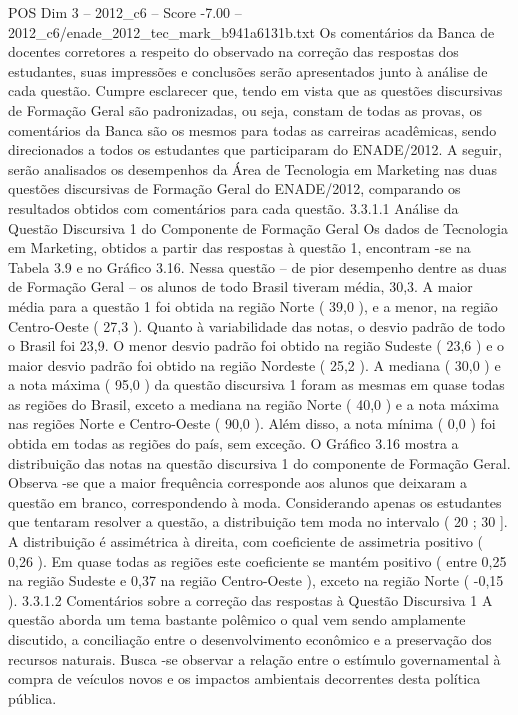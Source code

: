 \begin{textsample}{POS Dim 3 – 2012\_c6 – Score -7.00 – 2012\_c6/enade\_2012\_tec\_mark\_b941a6131b.txt}
Os comentários da Banca de docentes corretores a respeito do observado na correção das respostas dos estudantes, suas impressões e conclusões serão apresentados junto à análise de cada questão.
Cumpre esclarecer que, tendo em vista que as questões discursivas de Formação Geral são padronizadas, ou seja, constam de todas as provas, os comentários da Banca são os mesmos para todas as carreiras acadêmicas, sendo direcionados a todos os estudantes que participaram do ENADE/2012.
A seguir, serão analisados os desempenhos da Área de Tecnologia em Marketing nas duas questões discursivas de Formação Geral do ENADE/2012, comparando os resultados obtidos com comentários para cada questão. 3.3.1.1 Análise da Questão Discursiva 1 do Componente de Formação Geral Os dados de Tecnologia em Marketing, obtidos a partir das respostas à questão 1, encontram -se na Tabela 3.9 e no Gráfico 3.16.
Nessa questão – de pior desempenho dentre as duas de Formação Geral – os alunos de todo Brasil tiveram média, 30,3.
A maior média para a questão 1 foi obtida na região Norte ( 39,0 ), e a menor, na região Centro-Oeste ( 27,3 ).
Quanto à variabilidade das notas, o desvio padrão de todo o Brasil foi 23,9.
O menor desvio padrão foi obtido na região Sudeste ( 23,6 ) e o maior desvio padrão foi obtido na região Nordeste ( 25,2 ).
A mediana ( 30,0 ) e a nota máxima ( 95,0 ) da questão discursiva 1 foram as mesmas em quase todas as regiões do Brasil, exceto a mediana na região Norte ( 40,0 ) e a nota máxima nas regiões Norte e Centro-Oeste ( 90,0 ).
Além disso, a nota mínima ( 0,0 ) foi obtida em todas as regiões do país, sem exceção.
O Gráfico 3.16 mostra a distribuição das notas na questão discursiva 1 do componente de Formação Geral.
Observa -se que a maior frequência corresponde aos alunos que deixaram a questão em branco, correspondendo à moda.
Considerando apenas os estudantes que tentaram resolver a questão, a distribuição tem moda no intervalo ( 20 ; 30 ].
A distribuição é assimétrica à direita, com coeficiente de assimetria positivo ( 0,26 ).
Em quase todas as regiões este coeficiente se mantém positivo ( entre 0,25 na região Sudeste e 0,37 na região Centro-Oeste ), exceto na região Norte ( -0,15 ). 3.3.1.2 Comentários sobre a correção das respostas à Questão Discursiva 1 A questão aborda um tema bastante polêmico o qual vem sendo amplamente discutido, a conciliação entre o desenvolvimento econômico e a preservação dos recursos naturais.
Busca -se observar a relação entre o estímulo governamental à compra de veículos novos e os impactos ambientais decorrentes desta política pública.

\end{textsample}
